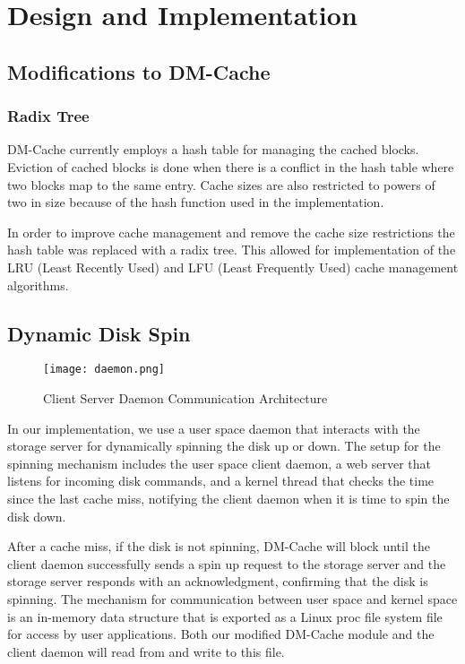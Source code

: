 \section{Design and Implementation}
\label{sec:implementation}

\subsection{Modifications to DM-Cache}

\subsubsection{Radix Tree}

DM-Cache currently employs a hash table for managing the cached blocks. Eviction
of cached blocks is done when there is a conflict in the hash table where two
blocks map to the same entry. Cache sizes are also restricted to powers of two
in size because of the hash function used in the implementation.

In order to improve cache management and remove the cache size restrictions the
hash table was replaced with a radix tree. This allowed for implementation of
the LRU (Least Recently Used) and LFU (Least Frequently Used) cache management
algorithms.

\subsection{Dynamic Disk Spin}

\begin{figure}[t]
  \caption{Client Server Daemon Communication Architecture}
  \centering \texttt{[image: daemon.png]}
  \label{fig:daemon}
\end{figure}

In our implementation, we use a user space daemon that interacts with the
storage server for dynamically spinning the disk up or down. The setup for the
spinning mechanism includes the user space client daemon, a web server that
listens for incoming disk commands, and a kernel thread that checks the time
since the last cache miss, notifying the client daemon when it is time to spin
the disk down.

After a cache miss, if the disk is not spinning, DM-Cache will block until the
client daemon successfully sends a spin up request to the storage server and the
storage server responds with an acknowledgment, confirming that the disk is
spinning. The mechanism for communication between user space and kernel space is
an in-memory data structure that is exported as a Linux proc file system file
for access by user applications. Both our modified DM-Cache module and the
client daemon will read from and write to this file.
